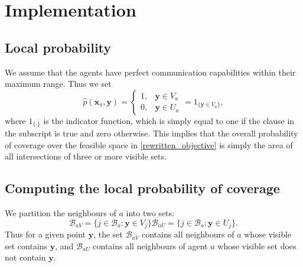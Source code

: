 \section{Implementation}
\subsection{Local probability}
We assume that the agents have perfect communication capabilities within their maximum range. Thus we set
\begin{equation}
  \hat{p}(\mathbf{x}_{a}, \mathbf{y}) = \begin{cases}
    1, &\mathbf{y}\in V_{a}\\
    0, &\mathbf{y}\in U_{a}
  \end{cases} = 1_{\big\{\mathbf{y}\in V_{a}\big\}},
\end{equation}
where $1_{\{\cdot\}}$ is the indicator function, which is simply equal to one if the clause in the subscript is true and zero otherwise.
This implies that the overall probability of coverage over the feasible space in \eqref{rewritten_objective} is simply the area of all intersections of three or more visible sets.

\subsection{Computing the local probability of coverage}
We partition the neighbours of $a$ into two sets:
\begin{subequations}
  \begin{equation}
    \mathcal{B}_{a V} = \{j\in\mathcal{B}_{a}: \mathbf{y}\in V_{j}\}
  \end{equation}
  \begin{equation}
    \mathcal{B}_{a U} = \{j\in\mathcal{B}_{a}: \mathbf{y}\in U_{j}\}.
  \end{equation}
\end{subequations}
Thus for a given point $\mathbf{y}$, the set $\mathcal{B}_{a V}$ contains all neighbours of $a$ whose visible set contains $\mathbf{y}$,
and $\mathcal{B}_{a U}$ contains all neighbours of agent $a$ whose visible set does not contain $\mathbf{y}$.

